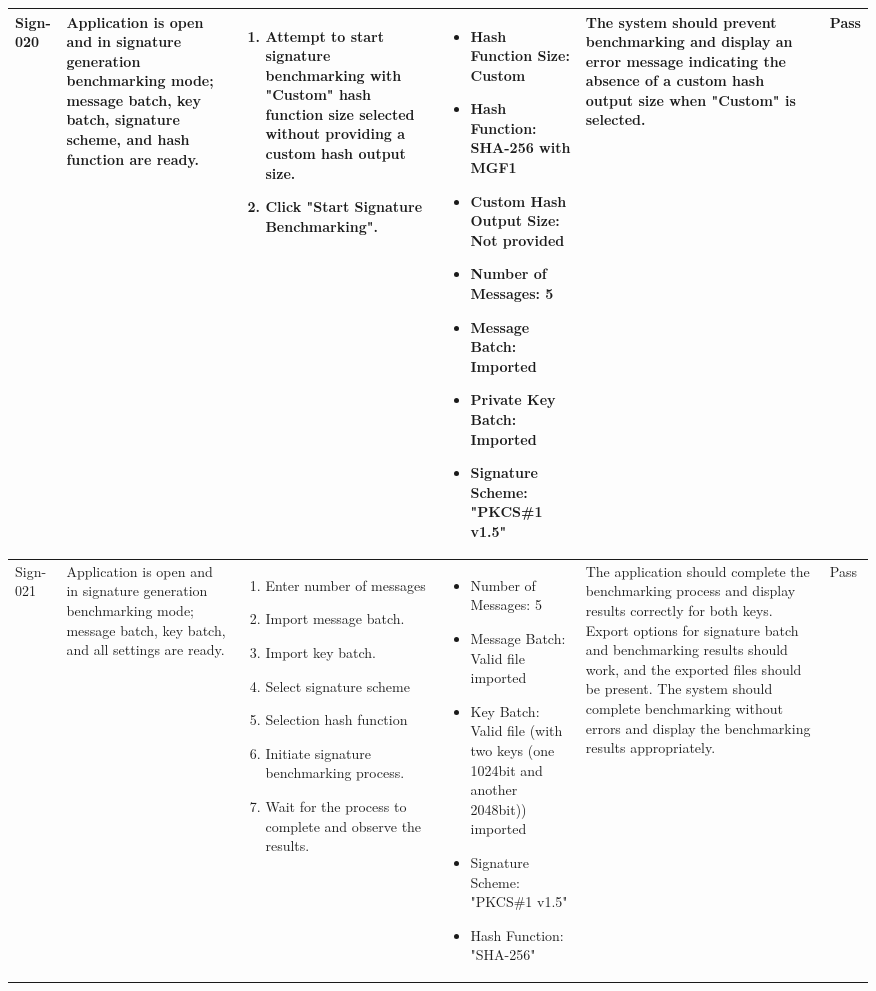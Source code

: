 \documentclass[]{final_report}
\theoremstyle{definition}
\begin{document}
\begin{longtable}{|l|p{2.5cm}|p{2.8cm}|p{3cm}|p{2cm}|p{1.5cm}|}
  Sign-020 & Application is open and in signature generation benchmarking mode; message batch, key batch, signature scheme, and hash function are ready. &
  \begin{enumerate}
    \item Attempt to start signature benchmarking with "Custom" hash function size selected without providing a custom hash output size.
    \item Click "Start Signature Benchmarking".
  \end{enumerate} & 
  \begin{itemize}
    \item Hash Function Size: Custom
     \item Hash Function: SHA-256 with MGF1
    \item Custom Hash Output Size: Not provided
    \item Number of Messages: 5
    \item Message Batch: Imported
    \item Private Key Batch: Imported
    \item Signature Scheme:  "PKCS\#1 v1.5"
  \end{itemize} &
  The system should prevent benchmarking and display an error message indicating the absence of a custom hash output size when "Custom" is selected. & Pass \\
  \hline
  Sign-021& Application is open and in signature generation benchmarking mode; message batch, key batch, and all settings are ready. &
  \begin{enumerate}
    \item Enter number of messages 
    \item Import message batch.
    \item Import key batch.
     \item Select signature scheme 
    \item Selection hash function
    \item Initiate signature benchmarking process.
    \item Wait for the process to complete and observe the results.
  \end{enumerate} & 
  \begin{itemize}
    \item Number of Messages: 5
    \item Message Batch: Valid file imported
    \item Key Batch: Valid file  (with two keys (one 1024bit and another 2048bit)) imported 
    \item Signature Scheme: "PKCS\#1 v1.5"
    \item Hash Function: "SHA-256"
  \end{itemize} &
  The application should complete the benchmarking process and display results correctly for both keys. Export options for signature batch and benchmarking results should work, and the exported files should be present.
  The system should complete benchmarking without errors and display the benchmarking results appropriately. & Pass \\
  \hline


\end{longtable}
\end{document}

